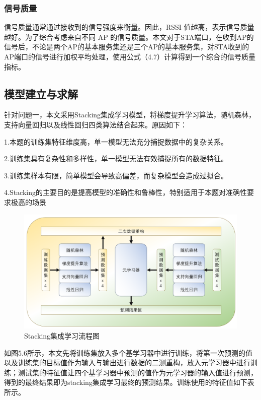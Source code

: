 \documentclass[bwprint]{gmcmthesis}
\begin{document}
\subsubsection{信号质量}



信号质量通常通过接收到的信号强度来衡量。因此，RSSI 值越高，表示信号质量越好。为了综合考虑来自不同 AP 的信号质量。本文对于STA端口，在收到AP的信号后，不论是两个AP的基本服务集还是三个AP的基本服务集，对STA收到的AP端口的信号进行加权平均处理，使用公式（4.7）计算得到一个综合的信号质量指标。




\subsection{模型建立与求解}

针对问题一，本文采用Stacking集成学习模型，将梯度提升学习算法，随机森林，支持向量回归以及线性回归四类算法结合起来。原因如下：

1.本题的训练集特征维度高，单一模型无法充分捕捉数据中的复杂关系。

2.训练集具有复杂性和多样性，单一模型无法有效捕捉所有的数据特征。

3.训练集样本有限，简单模型会导致高偏差，而复杂模型会造成过拟合。

4.Stacking的主要目的是提高模型的准确性和鲁棒性，特别适用于本题对准确性要求极高的场景


\begin{figure}[H]
	\centering
	\includegraphics[width=0.7\linewidth]{figures/stacking}
	\caption{Stacking集成学习流程图}
	\label{fig:Stacking集成学习流程图}
\end{figure}

如图5.6所示，本文先将训练集放入多个基学习器中进行训练，将第一次预测的值以及训练集的目标值作为输入与输出进行数据的二测重构，放入元学习器中进行训练；测试集的特征值让四个基学习器中预测的值作为元学习器的输入值进行预测，得到的最终结果即为stacking集成学习最终的预测结果。训练使用的特征值如下表所示。
\end{document}

